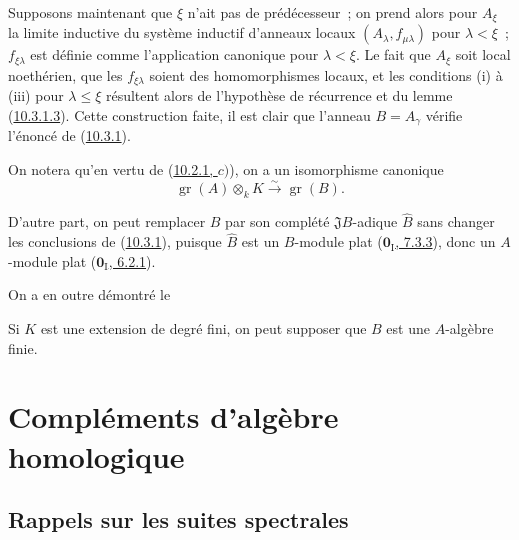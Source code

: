 \begin{env}[10.3.1.4]
Supposons maintenant que $\xi$ n'ait pas de prédécesseur~; on prend alors
pour $A_\xi$ la limite inductive du système inductif d'anneaux locaux
$(A_\lambda,f_{\mu\lambda})$ pour $\lambda<\xi$~; $f_{\xi\lambda}$ est définie
comme l'application canonique pour $\lambda<\xi$. Le fait que $A_\xi$ soit
local noethérien, que les $f_{\xi\lambda}$ soient des homomorphismes locaux,
et les conditions (i) à (iii) pour $\lambda\leq\xi$
résultent alors de l'hypothèse de récurrence et du lemme
(\hyperref[0.10.3.1.3-fr]{10.3.1.3}). Cette construction faite, il est clair
que l'anneau $B=A_\gamma$ vérifie l'énoncé de
(\hyperref[0.10.3.1-fr]{10.3.1}).
\end{env}

On notera qu'en vertu de (\hyperref[0.10.2.1-fr]{10.2.1, $c)$}), on a un
isomorphisme canonique
\[
\label{0.10.3.1.5-fr}
  \operatorname{gr}(A)\otimes_k K\xrightarrow{\sim}\operatorname{gr}(B).
  \tag{10.3.1.5}
\]

D'autre part, on peut remplacer $B$ par son complété $\mathfrak J B$-adique
$\widehat B$ sans changer les conclusions de
(\hyperref[0.10.3.1-fr]{10.3.1}), puisque $\widehat B$ est un $B$-module plat
(\hyperref[0.7.3.3-fr]{$\mathbf{0}_{\mathrm I}$, 7.3.3}), donc un $A$-module plat
(\hyperref[0.6.2.1-fr]{$\mathbf{0}_{\mathrm I}$, 6.2.1}).

On a en outre démontré le

\begin{corollary}[10.3.2]
\label{0.10.3.2-fr}
Si $K$ est une extension de degré fini, on peut supposer que $B$ est une
$A$-algèbre finie.
\end{corollary}

\section{Compléments d'algèbre homologique}
\label{section:0.11-fr}

\subsection{Rappels sur les suites spectrales}
\label{subsection:0.11.1-fr}


